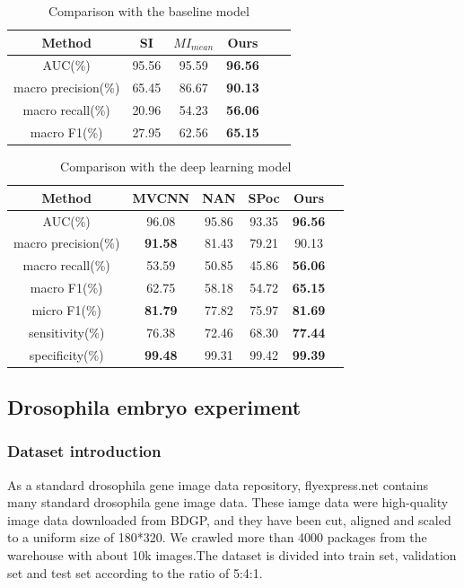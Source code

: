 \documentclass[10pt,twocolumn,letterpaper]{article}
\begin{document}
\begin{table}
\normalsize
\begin{center}
\begin{tabular}{|c|c|c|c|c|c|}
\hline
Method & SI & $MI_{mean}$ & Ours \\
\hline\hline
AUC(\%) & 95.56 & 95.59  & \textbf{96.56} \\
macro precision(\%) & 65.45 & 86.67 & \textbf{90.13} \\
macro recall(\%) & 20.96 & 54.23 & \textbf{56.06} \\
macro F1(\%) & 27.95 & 62.56 & \textbf{65.15} \\
\hline
\end{tabular}
\end{center}
\caption{Comparison with the baseline model}
\end{table}

\begin{table}
\normalsize
\begin{center}
\begin{tabular}{|c|c|c|c|c|c|}
\hline
Method & MVCNN & NAN & SPoc & Ours \\
\hline\hline
AUC(\%) & 96.08 & 95.86 & 93.35 & \textbf{96.56} \\
macro precision(\%) & \textbf{91.58} & 81.43 & 79.21 & 90.13 \\
macro recall(\%) & 53.59 & 50.85 & 45.86 & \textbf{56.06}\\
macro F1(\%) & 62.75 & 58.18 & 54.72 & \textbf{65.15} \\
micro F1(\%) & \textbf{81.79} & 77.82 & 75.97 & \textbf{81.69} \\
sensitivity(\%) & 76.38 & 72.46 & 68.30 & \textbf{77.44} \\
specificity(\%) & \textbf{99.48} & 99.31 & 99.42 & \textbf{99.39} \\
\hline
\end{tabular}
\end{center}
\caption{Comparison with the deep learning model}
\end{table}

\subsection{Drosophila embryo experiment}

\subsubsection{Dataset introduction}
As a standard drosophila gene image data repository\cite{ref26}, flyexpress.net contains many standard drosophila gene image data. These iamge data were high-quality image data downloaded from BDGP, and they have been cut, aligned and scaled to a uniform size of 180*320. We crawled more than 4000 packages from the warehouse with about 10k images.The dataset is divided into train set, validation set and test set according to the ratio of 5:4:1.
\end{document}
